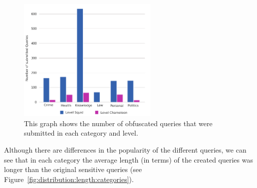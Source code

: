 \begin{figure}[h]
    \centering
    \includegraphics[width=0.6\textwidth]{graphics/evaluation/queries_per_category.pdf}
    \caption{This graph shows the number of obfuscated queries that were submitted in each category and level.}
    \label{fig:distribution:level:queries}
\end{figure}
Although there are differences in the popularity of the different queries, we can see that in each category the average length (in terms) of the created queries was longer than the original sensitive queries (see Figure~\ref{fig:distribution:length:categories}). 
